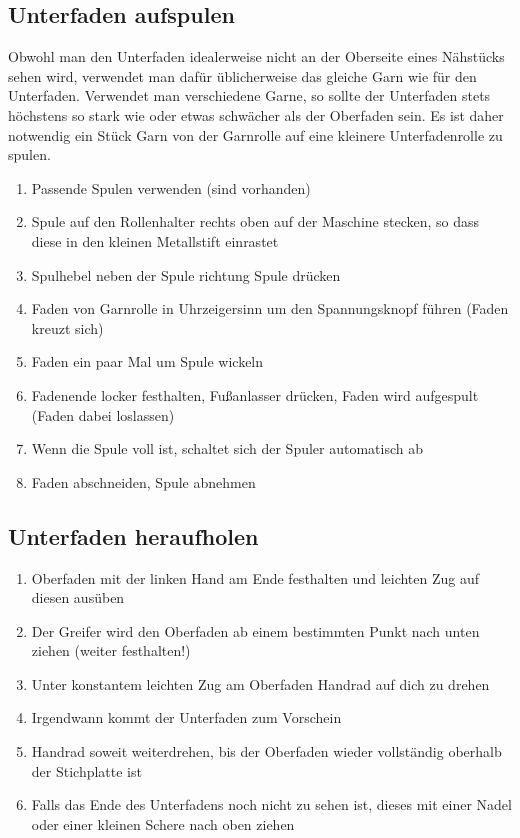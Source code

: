 \documentclass{\basedir/fablab-document}
\begin{document}
\subsection{Unterfaden aufspulen}
Obwohl man den Unterfaden idealerweise nicht an der Oberseite eines Nähstücks sehen wird, verwendet man dafür üblicherweise das gleiche Garn wie für den Unterfaden.
Verwendet man verschiedene Garne, so sollte der Unterfaden stets höchstens so stark wie oder etwas schwächer als der Oberfaden sein.
Es ist daher notwendig ein Stück Garn von der Garnrolle auf eine kleinere Unterfadenrolle zu spulen.

\begin{enumerate}
	\item Passende Spulen verwenden (sind vorhanden)
	\item Spule auf den Rollenhalter rechts oben auf der Maschine stecken, so dass diese in den kleinen Metallstift einrastet
	\item Spulhebel neben der Spule richtung Spule drücken
	\item Faden von Garnrolle in Uhrzeigersinn um den Spannungsknopf führen (Faden kreuzt sich)
	\item Faden ein paar Mal um Spule wickeln
	\item Fadenende locker festhalten, Fußanlasser drücken, Faden wird aufgespult (Faden dabei loslassen)
	\item Wenn die Spule voll ist, schaltet sich der Spuler automatisch ab
	\item Faden abschneiden, Spule abnehmen
\end{enumerate}

\subsection{Unterfaden heraufholen}
\begin{enumerate}
	\item Oberfaden mit der linken Hand am Ende festhalten und leichten Zug auf diesen ausüben
	\item Der Greifer wird den Oberfaden ab einem bestimmten Punkt nach unten ziehen (weiter festhalten!)
	\item Unter konstantem leichten Zug am Oberfaden Handrad auf dich zu drehen
	\item Irgendwann kommt der Unterfaden zum Vorschein
	\item Handrad soweit weiterdrehen, bis der Oberfaden wieder vollständig oberhalb der Stichplatte ist
	\item Falls das Ende des Unterfadens noch nicht zu sehen ist, dieses mit einer Nadel oder einer kleinen Schere nach oben ziehen
\end{enumerate}
\end{document}
